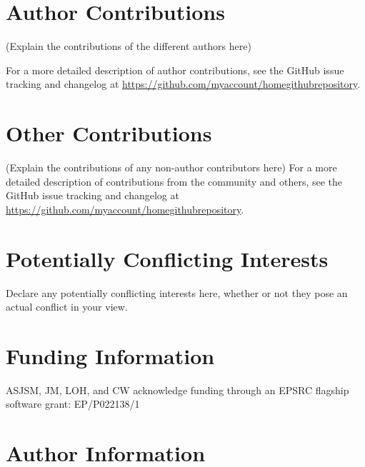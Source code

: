 \documentclass[9pt,tutorial]{livecoms}
\newcommand{\githubrepository}{\url{https://github.com/myaccount/homegithubrepository}}  %
\begin{document}
\section{Author Contributions}
%

(Explain the contributions of the different authors here)

For a more detailed description of author contributions,
see the GitHub issue tracking and changelog at \githubrepository.

\section{Other Contributions}
%

(Explain the contributions of any non-author contributors here)
For a more detailed description of contributions from the community and others, see the GitHub issue tracking and changelog at \githubrepository.

\section{Potentially Conflicting Interests}

Declare any potentially conflicting interests here, whether or not they pose an actual conflict in your view.

\section{Funding Information}
ASJSM, JM, LOH, and CW acknowledge funding through an EPSRC flagship software grant: EP/P022138/1

\section*{Author Information}
\makeorcid




\end{document}

